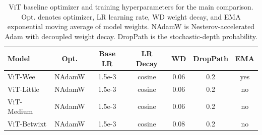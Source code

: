 \begin{table}[!htbp]
  \centering
  \caption{ViT baseline optimizer and training hyperparameters for the main comparison. Opt. denotes optimizer, LR learning rate, WD
  weight decay, and EMA exponential moving average of model weights. NAdamW
  is Nesterov-accelerated Adam with decoupled weight decay. DropPath is the
  stochastic-depth probability.}
  \label{tab:baseline-hparams-train}
  \begin{tabular}{lcccccc}
    \toprule
    Model & Opt. & Base LR & LR Decay & WD & DropPath & EMA \\
    \midrule
    ViT-Wee & NAdamW & 1.5e-3 & cosine & 0.06 & 0.2 & yes \\
    ViT-Little & NAdamW & 1.5e-3 & cosine & 0.06 & 0.2 & no \\
    ViT-Medium & NAdamW & 1.5e-3 & cosine & 0.06 & 0.2 & no \\
    ViT-Betwixt & NAdamW & 1.5e-3 & cosine & 0.08 & 0.2 & no \\
    \bottomrule
  \end{tabular}%
\end{table}